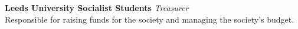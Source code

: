 %
\textbf{Leeds University Socialist Students}  \newline
\emph{Treasurer}\\
Responsible for raising funds for the society and managing the society's budget.

